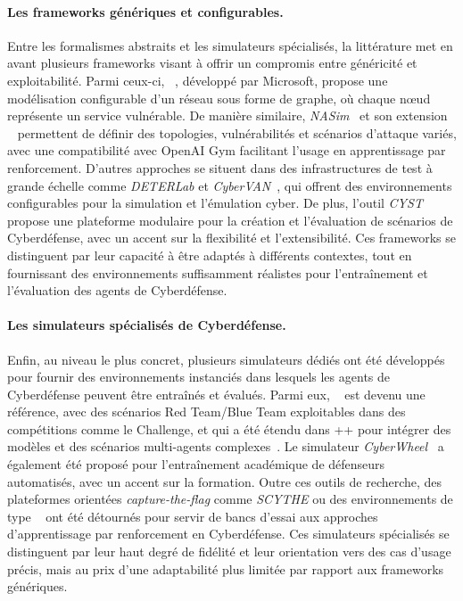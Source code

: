 \paragraph{Les frameworks génériques et configurables.}
Entre les formalismes abstraits et les simulateurs spécialisés, la littérature met en avant plusieurs frameworks visant à offrir un compromis entre généricité et exploitabilité. Parmi ceux-ci, ~\cite{cyberbattlesim}, développé par Microsoft, propose une modélisation configurable d'un réseau sous forme de graphe, où chaque nœud représente un service vulnérable. De manière similaire, \textit{NASim}~\cite{nasim2023} et son extension ~\cite{fernandes2024nasimemu} permettent de définir des topologies, vulnérabilités et scénarios d'attaque variés, avec une compatibilité avec OpenAI Gym facilitant l'usage en apprentissage par renforcement. D'autres approches se situent dans des infrastructures de test à grande échelle comme \textit{DETERLab} et \textit{CyberVAN}~\cite{Mirkovic2010}, qui offrent des environnements configurables pour la simulation et l'émulation cyber. De plus, l'outil \textit{CYST}~\cite{Drasar2020} propose une plateforme modulaire pour la création et l'évaluation de scénarios de Cyberdéfense, avec un accent sur la flexibilité et l'extensibilité. Ces frameworks se distinguent par leur capacité à être adaptés à différents contextes, tout en fournissant des environnements suffisamment réalistes pour l'entraînement et l'évaluation des agents de Cyberdéfense.

\paragraph{Les simulateurs spécialisés de Cyberdéfense.}
Enfin, au niveau le plus concret, plusieurs simulateurs dédiés ont été développés pour fournir des environnements instanciés dans lesquels les agents de Cyberdéfense peuvent être entraînés et évalués. Parmi eux, ~\cite{Standen2021} est devenu une référence, avec des scénarios Red Team/Blue Team exploitables dans des compétitions comme le  Challenge, et qui a été étendu dans ++ pour intégrer des modèles  et des scénarios multi-agents complexes~\cite{landolt2025cyborgpp}. Le simulateur \textit{CyberWheel}~\cite{vyas2025cyberwheel} a également été proposé pour l'entraînement académique de défenseurs automatisés, avec un accent sur la formation. Outre ces outils de recherche, des plateformes orientées \textit{capture-the-flag} comme \textit{SCYTHE} ou des environnements de type ~\cite{palmer2023ctf} ont été détournés pour servir de bancs d'essai aux approches d'apprentissage par renforcement en Cyberdéfense. Ces simulateurs spécialisés se distinguent par leur haut degré de fidélité et leur orientation vers des cas d'usage précis, mais au prix d'une adaptabilité plus limitée par rapport aux frameworks génériques.

